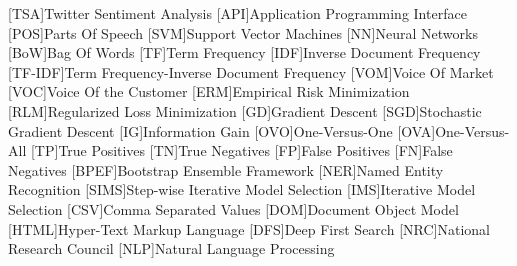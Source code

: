 \begin{acronym}
[TSA]{Twitter Sentiment Analysis}
[API]{Application Programming Interface}
[POS]{Parts Of Speech}
[SVM]{Support Vector Machines}
[NN]{Neural Networks}
[BoW]{Bag Of Words}
[TF]{Term Frequency}
[IDF]{Inverse Document Frequency}
[TF-IDF]{Term Frequency-Inverse Document Frequency}
[VOM]{Voice Of Market}
[VOC]{Voice Of the Customer}
[ERM]{Empirical Risk Minimization}
[RLM]{Regularized Loss Minimization}
[GD]{Gradient Descent}
[SGD]{Stochastic Gradient Descent}
[IG]{Information Gain}
[OVO]{One-Versus-One}
[OVA]{One-Versus-All}
[TP]{True Positives}
[TN]{True Negatives}
[FP]{False Positives}
[FN]{False Negatives}
[BPEF]{Bootstrap Ensemble Framework}
[NER]{Named Entity Recognition}
[SIMS]{Step-wise Iterative Model Selection}
[IMS]{Iterative Model Selection}
[CSV]{Comma Separated Values}
[DOM]{Document Object Model}
[HTML]{Hyper-Text Markup Language}
[DFS]{Deep First Search}
[NRC]{National Research Council}
[NLP]{Natural Language Processing}
\end{acronym}